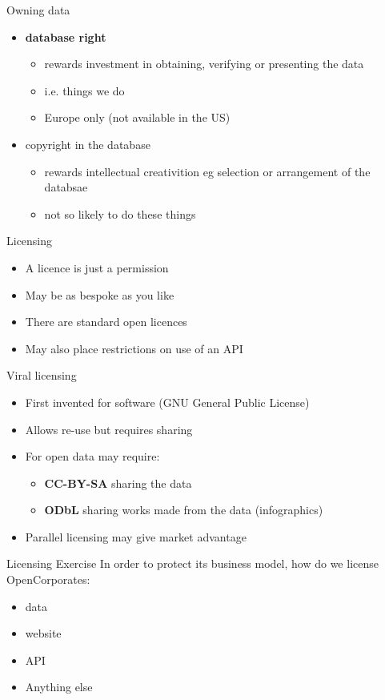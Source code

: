 \documentclass{beamer}
\begin{document}
\begin{frame}{Owning data}
  \begin{itemize}
  \item {\bf database right} 
    \begin{itemize}
    \item rewards investment in obtaining, verifying or presenting the data
    \item i.e. things we do
    \item Europe only (not available in the US)
    \end{itemize}
  \item copyright in the database
    \begin{itemize}
    \item rewards intellectual creativition eg selection or arrangement of the databsae
    \item not so likely to do these things
    \end{itemize}
\end{itemize}
\end{frame}

\begin{frame}{Licensing}
  \begin{itemize}
  \item A licence is just a permission
  \item May be as bespoke as you like
  \item There are standard open licences
  \item May also place restrictions on use of an API
  \end{itemize}
  
\end{frame}

\begin{frame}{Viral licensing}
  \begin{itemize}
  \item First invented for software (GNU General Public License)
  \item Allows re-use but requires sharing
  \item For open data may require:
    \begin{itemize}
    \item {\bf CC-BY-SA} sharing the data
    \item {\bf ODbL} sharing works made from the data (infographics)
    \end{itemize}
  \item Parallel licensing may give market advantage
  \end{itemize}
\end{frame}

\begin{frame}{Licensing Exercise}
In order to protect its business model, how do we license OpenCorporates:
\begin{itemize}
\item data
\item website
\item API
\item Anything else
\end{itemize}
  
\end{frame}
\end{document}
